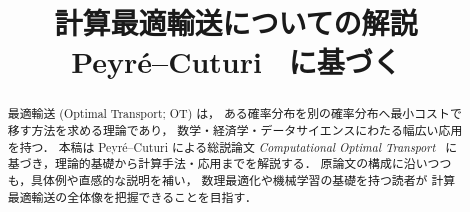 \documentclass[uplatex, dvipdfmx]{jsreport}
\title{計算最適輸送についての解説\\
\large Peyré--Cuturi~\cite{PeyreCuturi2019} に基づく}
\author{}
\date{}
\begin{document}
\maketitle

\begin{abstract}
最適輸送 (Optimal Transport; OT) は，
ある確率分布を別の確率分布へ最小コストで移す方法を求める理論であり，
数学・経済学・データサイエンスにわたる幅広い応用を持つ．
本稿は Peyré--Cuturi による総説論文
\emph{Computational Optimal Transport}~\cite{PeyreCuturi2019}
に基づき，理論的基礎から計算手法・応用までを解説する．
原論文の構成に沿いつつも，具体例や直感的な説明を補い，
数理最適化や機械学習の基礎を持つ読者が
計算最適輸送の全体像を把握できることを目指す．
\end{abstract}

\tableofcontents















\end{document}
